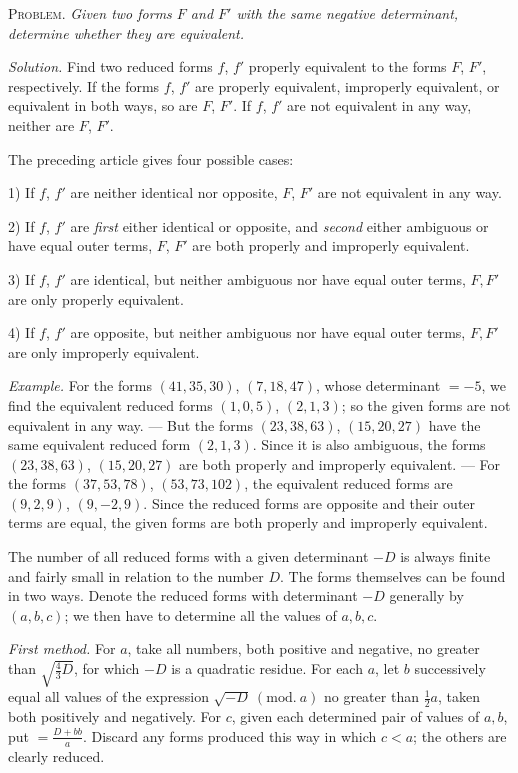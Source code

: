 \textsc{Problem.} \emph{Given two forms $F$ and $F'$ with the same negative determinant, determine whether they are equivalent.}

\emph{Solution.} Find two reduced forms $f$, $f'$ properly equivalent to the forms $F$, $F'$, respectively. If the forms $f$, $f'$ are properly equivalent, improperly equivalent, or equivalent in both ways, so are $F$, $F'$. If $f$, $f'$ are not equivalent in any way, neither are $F$, $F'$.

The preceding article gives four possible cases:

1) If $f$, $f'$ are neither identical nor opposite, $F$, $F'$ are not equivalent in any way.

2) If $f$, $f'$ are \emph{first} either identical or opposite, and \emph{second} either ambiguous or have equal outer terms, $F$, $F'$ are both properly and improperly equivalent.

3) If $f$, $f'$ are identical, but neither ambiguous nor have equal outer terms, $F,F'$ are only properly equivalent.

4) If $f$, $f'$ are opposite, but neither ambiguous nor have equal outer terms, $F,F'$ are only improperly equivalent.

\emph{Example.} For the forms $(41,35,30)$, $(7,18,47)$, whose determinant $=-5$, we find the equivalent reduced forms $(1,0,5)$, $(2,1,3)$; so the given forms are not equivalent in any way. --- But the forms $(23,38,63)$, $(15,20,27)$ have the same equivalent reduced
form $(2,1,3)$. Since it is also ambiguous, the forms $(23,38,63)$, $(15,20,27)$ are both properly and improperly equivalent. --- For the forms $(37,53,78)$, $(53,73,102)$, the equivalent reduced forms are $(9,2,9)$, $(9,-2,9)$. Since the reduced forms are opposite and their outer terms are equal, the given forms are both properly and improperly equivalent.

The number of all reduced forms with a given determinant $-D$ is always finite and fairly small in relation to the number $D$. The forms themselves can be found in two ways. Denote the reduced forms with determinant $-D$ generally by $(a,b,c)$; we then have to determine all the values of $a,b,c$.

\emph{First method.} For $a$, take all numbers, both positive and negative, no greater than $\surd{\frac43 D}$, for which $-D$ is a quadratic residue. For each $a$, let $b$ successively equal all values of the expression $\surd{-D}\ (\mathrm{mod.}\ a)$ no greater than $\frac12 a$, taken both positively and negatively. For $c$, given each determined pair of values of $a,b$, put $=\frac{D+bb}{a}$. Discard any forms produced this way in which $c<a$; the others are clearly reduced.

